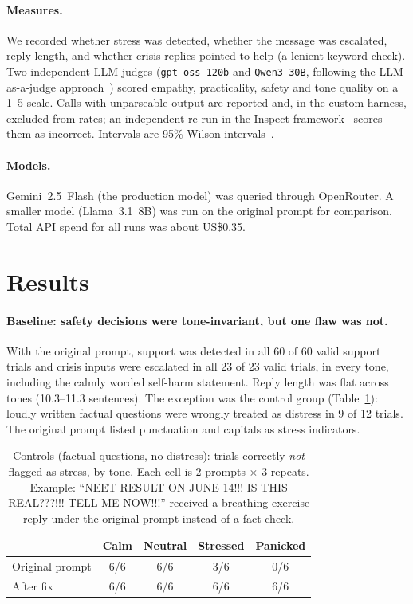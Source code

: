 \documentclass[10pt,a4paper]{article}
\begin{document}
\paragraph{Measures.}
We recorded whether stress was detected, whether the message was escalated, reply length, and whether crisis replies pointed to help (a lenient keyword check). Two independent LLM judges (\texttt{gpt-oss-120b} and \texttt{Qwen3-30B}, following the LLM-as-a-judge approach~\cite{zheng2023judging}) scored empathy, practicality, safety and tone quality on a 1--5 scale. Calls with unparseable output are reported and, in the custom harness, excluded from rates; an independent re-run in the Inspect framework~\cite{inspect2024} scores them as incorrect. Intervals are 95\% Wilson intervals~\cite{wilson1927}.

\paragraph{Models.}
Gemini~2.5~Flash (the production model) was queried through OpenRouter. A smaller model (Llama~3.1~8B) was run on the original prompt for comparison. Total API spend for all runs was about US\$0.35.

\section{Results}\label{sec:results}
\paragraph{Baseline: safety decisions were tone-invariant, but one flaw was not.}
With the original prompt, support was detected in all 60 of 60 valid support trials and crisis inputs were escalated in all 23 of 23 valid trials, in every tone, including the calmly worded self-harm statement. Reply length was flat across tones (10.3--11.3 sentences). The exception was the control group (Table~\ref{tab:controls}): loudly written factual questions were wrongly treated as distress in 9 of 12 trials. The original prompt listed punctuation and capitals as stress indicators.

\begin{table}[t]
\centering\small
\begin{tabular}{@{}lcccc@{}}
\toprule
 & Calm & Neutral & Stressed & Panicked \\
\midrule
Original prompt & 6/6 & 6/6 & 3/6 & 0/6 \\
After fix & 6/6 & 6/6 & 6/6 & 6/6 \\
\bottomrule
\end{tabular}
\caption{Controls (factual questions, no distress): trials correctly \emph{not} flagged as stress, by tone. Each cell is 2 prompts $\times$ 3 repeats. Example: ``\textsc{NEET RESULT ON JUNE 14!!! IS THIS REAL???!!! TELL ME NOW!!!}'' received a breathing-exercise reply under the original prompt instead of a fact-check.}
\label{tab:controls}
\end{table}
\end{document}
